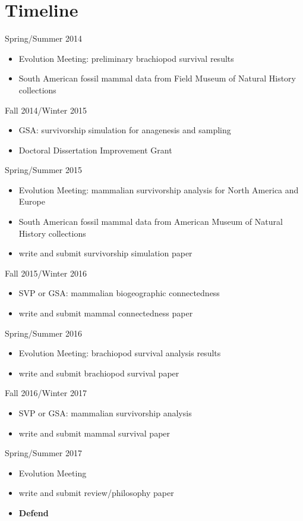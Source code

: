 \documentclass[12pt,letterpaper]{article}
\begin{document}
\clearpage
\section{Timeline}

Spring/Summer 2014
\begin{itemize}
  \item Evolution Meeting: preliminary brachiopod survival results
  \item South American fossil mammal data from Field Museum of Natural History collections
\end{itemize}

Fall 2014/Winter 2015
\begin{itemize}
  \item GSA: survivorship simulation for anagenesis and sampling
  \item Doctoral Dissertation Improvement Grant
\end{itemize}

Spring/Summer 2015
\begin{itemize}
  \item Evolution Meeting: mammalian survivorship analysis for North America and Europe
  \item South American fossil mammal data from American Museum of Natural History collections
  \item write and submit survivorship simulation paper
\end{itemize}

Fall 2015/Winter 2016
\begin{itemize}
  \item SVP or GSA: mammalian biogeographic connectedness
  \item write and submit mammal connectedness paper
\end{itemize}

Spring/Summer 2016
\begin{itemize}
  \item Evolution Meeting: brachiopod survival analysis results
  \item write and submit brachiopod survival paper
\end{itemize}

Fall 2016/Winter 2017
\begin{itemize}
  \item SVP or GSA: mammalian survivorship analysis
  \item write and submit mammal survival paper
\end{itemize}

Spring/Summer 2017
\begin{itemize}
  \item Evolution Meeting
  \item write and submit review/philosophy paper
  \item \textbf{Defend}
\end{itemize}



\clearpage


\end{document}
